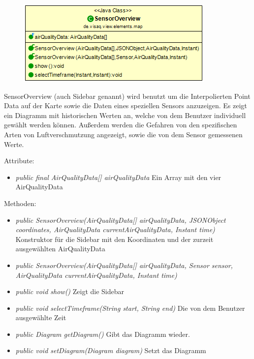\begin{minipage}{0.4\textwidth}
    \begin{figure}[H]
        \includegraphics[scale = 0.5]{media/frontend/view/de.view.elements.map/SensorOverview_Class.png}
    \end{figure}
    \end{minipage} \hfill
    \begin{minipage}{0.4\textwidth}
SensorOverview (auch Sidebar genannt) wird benutzt um die Interpolierten Point Data auf der Karte sowie die Daten eines speziellen Sensors anzuzeigen. Es zeigt ein Diagramm mit historischen Werten an, welche von dem Benutzer individuell gewählt werden können. Außerdem werden die Gefahren von den spezifischen Arten von Luftverschmutzung angezeigt, sowie die von dem Sensor gemessenen Werte.
\end{minipage}

Attribute:
\begin{itemize}
    \item \emph{public final AirQualityData[] airQualityData} Ein Array mit den vier AirQualityData
\end{itemize}
Methoden:
\begin{itemize}
    \item \emph{public SensorOverview(AirQualityData[] airQualityData, JSONObject coordinates, AirQualityData currentAirQualityData, Instant time)} Konstruktor für die Sidebar mit den Koordinaten und der zurzeit ausgewählten AirQualityData
    \item \emph{public SensorOverview(AirQualityData[] airQualityData, Sensor sensor, AirQualityData currentAirQualityData, Instant time)}
    \item \emph{public void show()} Zeigt die Sidebar
    \item \emph{public void selectTimeframe(String start, String end)} Die von dem Benutzer ausgewählte Zeit
    \item \emph{public Diagram getDiagram()} Gibt das Diagramm wieder.
    \item \emph{public void setDiagram(Diagram diagram)} Setzt das Diagramm
\end{itemize}
